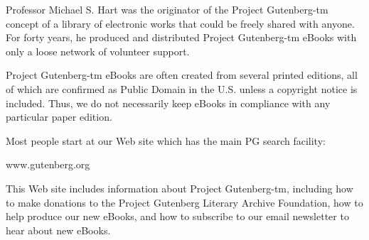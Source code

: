 \begin{PGtext}
Professor Michael S. Hart was the originator of the Project Gutenberg-tm
concept of a library of electronic works that could be freely shared
with anyone.  For forty years, he produced and distributed Project
Gutenberg-tm eBooks with only a loose network of volunteer support.

Project Gutenberg-tm eBooks are often created from several printed
editions, all of which are confirmed as Public Domain in the U.S.
unless a copyright notice is included.  Thus, we do not necessarily
keep eBooks in compliance with any particular paper edition.

Most people start at our Web site which has the main PG search facility:

     www.gutenberg.org

This Web site includes information about Project Gutenberg-tm,
including how to make donations to the Project Gutenberg Literary
Archive Foundation, how to help produce our new eBooks, and how to
subscribe to our email newsletter to hear about new eBooks.
\end{PGtext}



